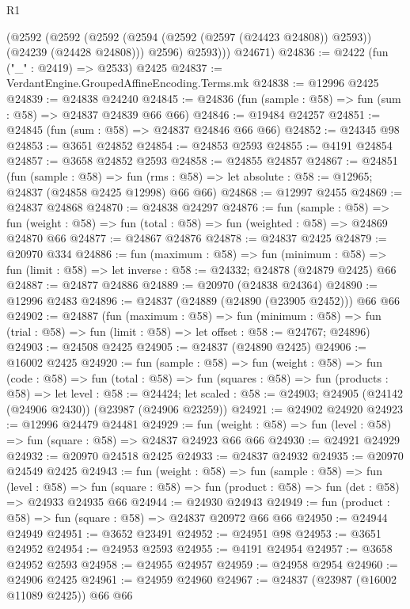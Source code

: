 \begin{lexlean}{R1}
\begin{coremodule}
          (@2592
            (@2592
              (@2592 (@2594 (@2592 (@2597 (@24423 @24808)) @2593)) (@24239 (@24428 @24808)))
              @2596)
            @2593)))
      @24671)
@24836 := @2422 (fun ("_" : @2419) => @2533) @2425
@24837 := VerdantEngine.GroupedAffineEncoding.Terms.mk
@24838 := @12996 @2425
@24839 := @24838 @24240
@24845 := @24836 (fun (sample : @58) => fun (sum : @58) => @24837 @24839 @66 @66)
@24846 := @19484 @24257
@24851 := @24845 (fun (sum : @58) => @24837 @24846 @66 @66)
@24852 := @24345 @98
@24853 := @3651 @24852
@24854 := @24853 @2593
@24855 := @4191 @24854
@24857 := @3658 @24852 @2593
@24858 := @24855 @24857
@24867 := @24851
    (fun (sample : @58) =>
    fun (rms : @58) => let absolute : @58 := @12965; @24837 (@24858 @2425 @12998) @66 @66)
@24868 := @12997 @2455
@24869 := @24837 @24868
@24870 := @24838 @24297
@24876 := fun (sample : @58) =>
  fun (weight : @58) => fun (total : @58) => fun (weighted : @58) => @24869 @24870 @66
@24877 := @24867 @24876
@24878 := @24837 @2425
@24879 := @20970 @334
@24886 := fun (maximum : @58) =>
  fun (minimum : @58) => fun (limit : @58) => let inverse : @58 := @24332; @24878 (@24879 @2425) @66
@24887 := @24877 @24886
@24889 := @20970 (@24838 @24364)
@24890 := @12996 @2483
@24896 := @24837 (@24889 (@24890 (@23905 @2452))) @66 @66
@24902 := @24887
    (fun (maximum : @58) =>
    fun (minimum : @58) =>
    fun (trial : @58) => fun (limit : @58) => let offset : @58 := @24767; @24896)
@24903 := @24508 @2425
@24905 := @24837 (@24890 @2425)
@24906 := @16002 @2425
@24920 := fun (sample : @58) =>
  fun (weight : @58) =>
  fun (code : @58) =>
  fun (total : @58) =>
  fun (squares : @58) =>
  fun (products : @58) =>
  let level : @58 := @24424;
  let scaled : @58 := @24903; @24905 (@24142 (@24906 @2430)) (@23987 (@24906 @23259))
@24921 := @24902 @24920
@24923 := @12996 @24479 @24481
@24929 := fun (weight : @58) => fun (level : @58) => fun (square : @58) => @24837 @24923 @66 @66
@24930 := @24921 @24929
@24932 := @20970 @24518 @2425
@24933 := @24837 @24932
@24935 := @20970 @24549 @2425
@24943 := fun (weight : @58) =>
  fun (sample : @58) =>
  fun (level : @58) =>
  fun (square : @58) => fun (product : @58) => fun (det : @58) => @24933 @24935 @66
@24944 := @24930 @24943
@24949 := fun (product : @58) => fun (square : @58) => @24837 @20972 @66 @66
@24950 := @24944 @24949
@24951 := @3652 @23491
@24952 := @24951 @98
@24953 := @3651 @24952
@24954 := @24953 @2593
@24955 := @4191 @24954
@24957 := @3658 @24952 @2593
@24958 := @24955 @24957
@24959 := @24958 @2954
@24960 := @24906 @2425
@24961 := @24959 @24960
@24967 := @24837 (@23987 (@16002 @11089 @2425)) @66 @66

\end{coremodule}
\end{lexlean}
